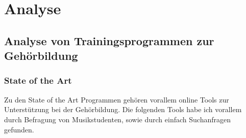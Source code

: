 

\chapter{Analyse}

%
%


\section{Analyse von Trainingsprogrammen zur Gehörbildung}

\subsection{State of the Art}

Zu den State of the Art Programmen gehören vorallem online Tools zur Unterstützung bei der Gehörbildung. Die folgenden Tools habe ich vorallem durch Befragung von Musikstudenten, sowie durch einfach Suchanfragen gefunden.

